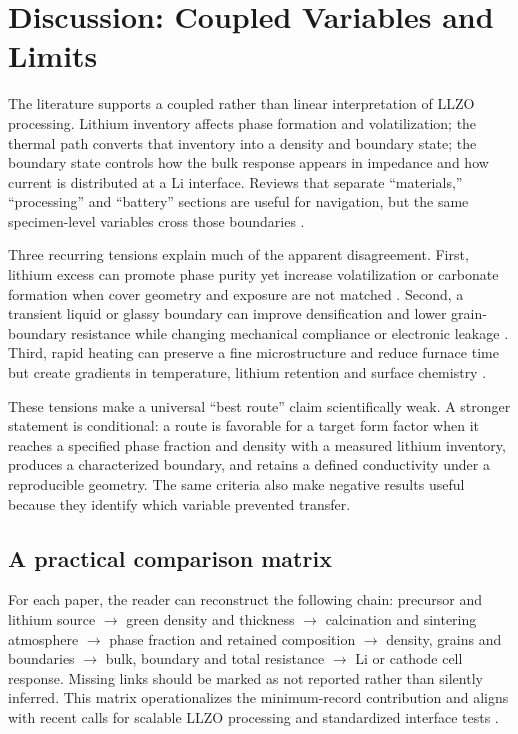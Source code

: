 \section{Discussion: Coupled Variables and Limits}
\label{sec:discussion}

The literature supports a coupled rather than linear interpretation of LLZO processing. Lithium inventory affects phase formation and volatilization; the thermal path converts that inventory into a density and boundary state; the boundary state controls how the bulk response appears in impedance and how current is distributed at a Li interface. Reviews that separate “materials,” “processing” and “battery” sections are useful for navigation, but the same specimen-level variables cross those boundaries \cite{cao2019modeling,wang2020garnet,wang2024accelerating,zhao2024review}.

Three recurring tensions explain much of the apparent disagreement. First, lithium excess can promote phase purity yet increase volatilization or carbonate formation when cover geometry and exposure are not matched \cite{heywood2023tailoring,gullbrekken2025phase,montoya2024lithium,shi2025li2co3}. Second, a transient liquid or glassy boundary can improve densification and lower grain-boundary resistance while changing mechanical compliance or electronic leakage \cite{luo2019influence,park2026li2co3,yao2026elimination}. Third, rapid heating can preserve a fine microstructure and reduce furnace time but create gradients in temperature, lithium retention and surface chemistry \cite{aman2026susceptor,ramos2026ultrafast,zhang2024unveiling}.

These tensions make a universal “best route” claim scientifically weak. A stronger statement is conditional: a route is favorable for a target form factor when it reaches a specified phase fraction and density with a measured lithium inventory, produces a characterized boundary, and retains a defined conductivity under a reproducible geometry. The same criteria also make negative results useful because they identify which variable prevented transfer.

\subsection{A practical comparison matrix}

For each paper, the reader can reconstruct the following chain: precursor and lithium source $\rightarrow$ green density and thickness $\rightarrow$ calcination and sintering atmosphere $\rightarrow$ phase fraction and retained composition $\rightarrow$ density, grains and boundaries $\rightarrow$ bulk, boundary and total resistance $\rightarrow$ Li or cathode cell response. Missing links should be marked as not reported rather than silently inferred. This matrix operationalizes the minimum-record contribution and aligns with recent calls for scalable LLZO processing and standardized interface tests \cite{wang2024accelerating,touidjine2026tapex,klimpel2023standardizing}.

